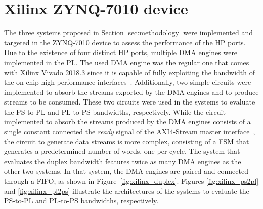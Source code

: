 \section{Xilinx ZYNQ-7010 device}\label{sec:xilinx}

The three systems proposed in Section \ref{sec:methodology} were implemented and targeted in the ZYNQ-7010 device to assess the performance of the \ac{HP} ports. Due to the existence of four distinct \ac{HP} ports, multiple \ac{DMA} engines were implemented in the \ac{PL}. The used \ac{DMA} engine was the regular one that comes with Xilinx Vivado 2018.3 since it is capable of fully exploiting the bandwidth of the on-chip high-performance interfaces~\cite{xilinx2019dma}. Additionally, two simple circuits were implemented to absorb the streams exported by the \ac{DMA} engines and to produce streams to be consumed. These two circuits were used in the systems to evaluate the \ac{PS}-to-\ac{PL} and \ac{PL}-to-\ac{PS} bandwidths, respectively. While the circuit implemented to absorb the streams produced by the \ac{DMA} engines consists of a single constant connected the \textit{ready} signal of the AXI4-Stream master interface~\cite{xilinx2011axi}, the circuit to generate data streams is more complex, consisting of a \ac{FSM} that generates a predetermined number of words, one per cycle. The system that evaluates the duplex bandwidth features twice as many \ac{DMA} engines as the other two systems. In that system, the \ac{DMA} engines are paired and connected through a \ac{FIFO}, as shown in Figure~\ref{fig:xilinx_duplex}. Figures \ref{fig:xilinx_ps2pl} and \ref{fig:xilinx_pl2ps} illustrate the architectures of the systems to evaluate the \ac{PS}-to-\ac{PL} and \ac{PL}-to-\ac{PS} bandwidths, respectively.

